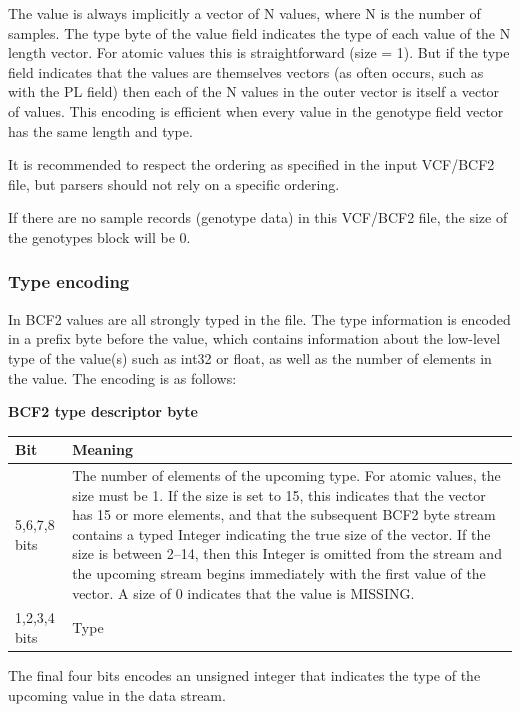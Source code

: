 \documentclass[8pt]{article}
\begin{document}
The value is always implicitly a vector of N values, where N is the number of samples.
The type byte of the value field indicates the type of each value of the N length vector.
For atomic values this is straightforward (size = 1).
But if the type field indicates that the values are themselves vectors (as often occurs, such as with the PL field) then each of the N values in the outer vector is itself a vector of values.
This encoding is efficient when every value in the genotype field vector has the same length and type.

It is recommended to respect the ordering as specified in the input VCF/BCF2 file, but parsers should not rely on a specific ordering.

If there are no sample records (genotype data) in this VCF/BCF2 file, the size of the genotypes block will be 0.


\subsubsection{Type encoding}
\label{BcfTypeEncoding}

In BCF2 values are all strongly typed in the file.
The type information is encoded in a prefix byte before the value, which contains information about the low-level type of the value(s) such as int32 or float, as well as the number of elements in the value.
The encoding is as follows:

\vspace{0.3cm}
\textbf{BCF2 type descriptor byte}

\vspace{0.3cm}
\begin{tabular}{|p{2cm} | p{10cm}|} \hline
Bit & Meaning \\ \hline
5,6,7,8 bits & The number of elements of the upcoming type.
For atomic values, the size must be 1.
If the size is set to 15, this indicates that the vector has 15 or more elements, and that the subsequent BCF2 byte stream contains a typed Integer indicating the true size of the vector.
If the size is between 2--14, then this Integer is omitted from the stream and the upcoming stream begins immediately with the first value of the vector.
A size of 0 indicates that the value is MISSING. \\ \hline
1,2,3,4 bits & Type \\ \hline
\end{tabular}
\vspace{0.3cm}

The final four bits encodes an unsigned integer that indicates the type of the upcoming value in the data stream.
\end{document}
